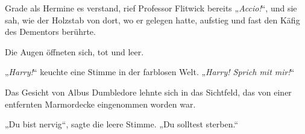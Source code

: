 Grade als Hermine es verstand, rief Professor Flitwick bereits „\emph{Accio!}“, und sie sah, wie der Holzstab von dort, wo er gelegen hatte, aufstieg und fast den Käfig des Dementors berührte.

Die Augen öffneten sich, tot und leer.

„\emph{Harry!}“ keuchte eine Stimme in der farblosen Welt. „\emph{Harry! Sprich mit mir!}“

Das Gesicht von Albus Dumbledore lehnte sich in das Sichtfeld, das von einer entfernten Marmordecke eingenommen worden war.

„Du bist nervig“, sagte die leere Stimme. „Du solltest sterben.“

